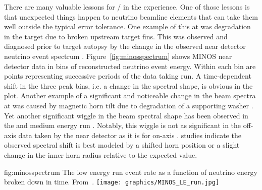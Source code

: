 There are many valuable lessons for / in the  experience. One of those lessons is that unexpected things happen to neutrino beamline elements that can take them well outside the typical error tolerance.  One example of this at  was degradation in the target due to broken upstream target fins.  This was observed and diagnosed prior to target autopsy by the change in the observed near detector neutrino event spectrum \cite{Holin2017}.  Figure~\ref{fig:minosspectrum} shows MINOS near detector data in bins of reconstructed neutrino event energy.  Within each bin are points representing successive periods of the data taking run.  A time-dependent shift in the three peak bins, i.e. a change in the spectral shape, is obvious in the plot. Another example of a significant and noticeable change in the beam spectra at  was caused by magnetic horn tilt due to degradation of a supporting washer \cite{Hylen2016}.  Yet another significant wiggle in the beam spectral shape has been observed in the  and  medium energy run \cite{JenaNUINT2018}.  Notably, this wiggle is not as significant in the off-axis data taken by the  near detector as it is for on-axis .   studies indicate the observed spectral shift is best modeled by a shifted horn position or a slight change in the inner horn radius relative to the expected value.

\begin{dunefigure}{fig:minosspectrum}
{The low energy run  event rate as a function of neutrino energy broken down in time. From~\cite{Holin2017}.}
  \texttt{[image: graphics/MINOS\_LE\_run.jpg]}
\end{dunefigure}

